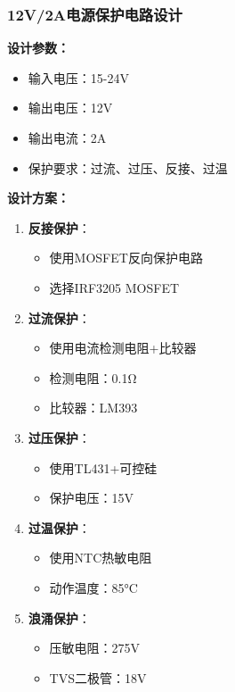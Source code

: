 \documentclass[12pt,UTF8]{ctexbook}
\begin{document}
\subsubsection{12V/2A电源保护电路设计}

\textbf{设计参数：}
\begin{itemize}
    \item 输入电压：15-24V
    \item 输出电压：12V
    \item 输出电流：2A
    \item 保护要求：过流、过压、反接、过温
\end{itemize}

\textbf{设计方案：}

\begin{enumerate}
    \item \textbf{反接保护}：
    \begin{itemize}
        \item 使用MOSFET反向保护电路
        \item 选择IRF3205 MOSFET
    \end{itemize}
    
    \item \textbf{过流保护}：
    \begin{itemize}
        \item 使用电流检测电阻+比较器
        \item 检测电阻：0.1Ω
        \item 比较器：LM393
    \end{itemize}
    
    \item \textbf{过压保护}：
    \begin{itemize}
        \item 使用TL431+可控硅
        \item 保护电压：15V
    \end{itemize}
    
    \item \textbf{过温保护}：
    \begin{itemize}
        \item 使用NTC热敏电阻
        \item 动作温度：85°C
    \end{itemize}
    
    \item \textbf{浪涌保护}：
    \begin{itemize}
        \item 压敏电阻：275V
        \item TVS二极管：18V
    \end{itemize}
\end{enumerate}
\end{document}

